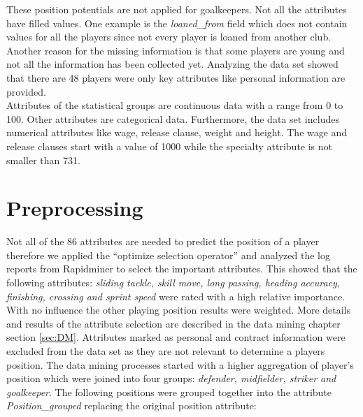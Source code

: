 \documentclass[runningheads]{llncs}
\begin{document}
These position potentials are not applied for goalkeepers. 
Not all the attributes have filled values. One example is the \textit{loaned\_from} field which does not contain values for all the players since not every player is loaned from another club. Another reason for the missing information is that some players are young and not all the information has been collected yet. 
Analyzing the data set showed that there are 48 players were only key attributes like personal information are provided. \\
Attributes of the statistical groups are continuous data with a range from 0 to 100. Other attributes are categorical data. Furthermore, the data set includes numerical attributes like wage, release clause, weight and height.
The wage and release clauses start with a value of 1000 while the specialty attribute is not smaller than 731.


\section{Preprocessing}
\label{sec:preprocessing}
Not all of the 86 attributes are needed to predict the position of a player therefore we applied the ``optimize selection operator'' and analyzed the log reports from Rapidminer to select the important attributes.
This showed that the following attributes:\textit{ sliding tackle, skill move, long passing, heading accuracy, finishing, crossing and sprint speed} were rated with a high relative importance. With no influence the other playing position results were weighted. More details and results of the attribute selection are described in the data mining chapter section \ref{sec:DM}.
Attributes marked as personal and contract information were excluded from the data set as they are not relevant to determine a players position. 
The data mining processes started with a higher aggregation of player's position which were joined into four groups: \textit{defender, midfielder, striker and goalkeeper}. The following positions were grouped together into the attribute  \textit{Position\_grouped} replacing the original position attribute:
\end{document}
